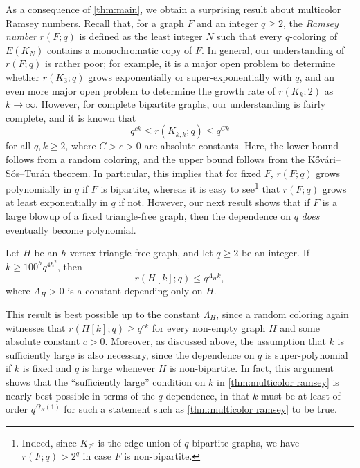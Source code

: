 As a consequence of \cref{thm:main}, we obtain a surprising result about multicolor Ramsey numbers. Recall that, for a graph $F$ and an integer $q \geq 2$, the \emph{Ramsey number} $r(F;q)$ is defined as the least integer $N$ such that every $q$-coloring of $E(K_N)$ contains a monochromatic copy of $F$. In general, our understanding of $r(F;q)$ is rather poor; for example, it is a major open problem \cite{MR1815606,MR4357431,MR0177846} to determine whether $r(K_3;q)$ grows exponentially or super-exponentially with $q$, and an even more major open problem \cite{MR366726,MR2552114,MR4548417,2303.09521} to determine the growth rate of $r(K_k;2)$ as $k \to \infty$. However, for complete bipartite graphs, our understanding is fairly complete, and it is known \cite{MR0360329} that
\begin{equation}\label{eq:multicolor K_kk}
    q^{ck} \leq r(K_{k,k};q) \leq q^{Ck}
\end{equation}
for all $q,k \geq 2$, where $C>c>0$ are absolute constants. Here, the lower bound follows from a random coloring, and the upper bound follows from the K\H ov\'ari--S\'os--Tur\'an theorem. In particular, this implies that for fixed $F$,
$r(F;q)$ grows polynomially in $q$ if $F$ is bipartite, whereas it is easy to see\footnote{Indeed, since $K_{2^q}$ is the edge-union of $q$ bipartite graphs, we have $r(F;q)>2^q$ in case $F$ is non-bipartite.}  that $r(F;q)$ grows at least exponentially in $q$ if not. However, our next result shows that if $F$ is a large blowup of a fixed triangle-free graph, then the dependence on $q$ \emph{does} eventually become polynomial.
\begin{theorem}\label{thm:multicolor ramsey}
    Let $H$ be an $h$-vertex triangle-free graph, and let $q \geq 2$ be an integer. If $k \geq 100^h q^{4h^2}$, then
    \[
        r(H[k];q) \leq q^{\Lambda_H k},
    \]
    where $\Lambda_H>0$ is a constant depending only on $H$.
\end{theorem}
This result is best possible up to the constant $\Lambda_H$, since a random coloring again witnesses that $r(H[k];q)\geq q^{ck}$ for every non-empty graph $H$ and some absolute constant $c>0$. Moreover, as discussed above, the assumption that $k$ is sufficiently large is also necessary, since the dependence on $q$ is super-polynomial if $k$ is fixed and $q$ is large whenever $H$ is non-bipartite. In fact, this argument shows that the ``sufficiently large'' condition on $k$ in \cref{thm:multicolor ramsey} is nearly best possible in terms of the $q$-dependence, in that $k$ must be at least of order $q^{\Omega_H(1)}$ for such a statement such as \cref{thm:multicolor ramsey} to be true.

